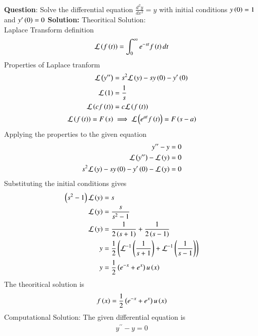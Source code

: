 \documentclass[journal]{IEEEtran}
\begin{document}
\textbf{Question}:\newline
Solve the differential equation $\frac{d^2y}{dx^2} = y$ with initial conditions $y\left(0\right) = 1$ and $y^{\prime}\left(0\right) = 0$
\newline
\textbf{Solution: }
\newline
Theoritical Solution:\\
Laplace Transform definition\\
\begin{align}
	\mathcal{L}\left(f\left(t\right)\right) = \int_{0}^{\infty}e^{-st}f\left(t\right)dt
\end{align}
Properties of Laplace tranform
\begin{align}
	\mathcal{L}\left(y^{\prime\prime}\right) &= s^2\mathcal{L}\left(y\right) -sy\left(0\right)-y^\prime\left(0\right)\\
	\mathcal{L}\left(1\right) &= \frac{1}{s}\\
	\mathcal{L}\left(cf\left(t\right)\right) &= c\mathcal{L}\left(f\left(t\right)\right)\\
	\mathcal{L}\left(f\left(t\right)\right) = F\left(s\right) &\implies \mathcal{L}\left(e^{at}f\left(t\right)\right) = F\left(s-a\right)
\end{align}
Applying the properties to the given equation
\begin{align}
	y^{\prime\prime} - y &= 0\\
	\mathcal{L}\left(y^{\prime\prime}\right) - \mathcal{L}\left(y\right) &= 0\\
	s^2\mathcal{L}\left(y\right) -sy\left(0\right)-y^\prime\left(0\right)-\mathcal{L}\left(y\right) &= 0\\
\end{align}
Substituting the initial conditions gives
\begin{align}
	\left(s^2-1\right)\mathcal{L}\left(y\right)&= s\\
	\mathcal{L}\left(y\right) &= \frac{s}{s^2 - 1}\\
	 \mathcal{L}\left(y\right) &= \frac{1}{2\left(s+1\right)}+\frac{1}{2\left(s-1\right)}\\
	y &= \frac{1}{2}\left(\mathcal{L}^{-1}\left(\frac{1}{s+1}\right)+\mathcal{L}^{-1}\left(\frac{1}{s-1}\right)\right)\\
	y &= \frac{1}{2}\left(e^{-x}+e^{x}\right)u\left(x\right)
\end{align}
The theoritical solution is 
\begin{align}
	f\left(x\right) = \frac{1}{2}\left(e^{-x}+e^{x}\right)u\left(x\right)
\end{align}
\newline
Computational Solution:\newline
The given differential equation is
\begin{align}
	y^{\prime\prime} - y = 0
\end{align}
\end{document}
